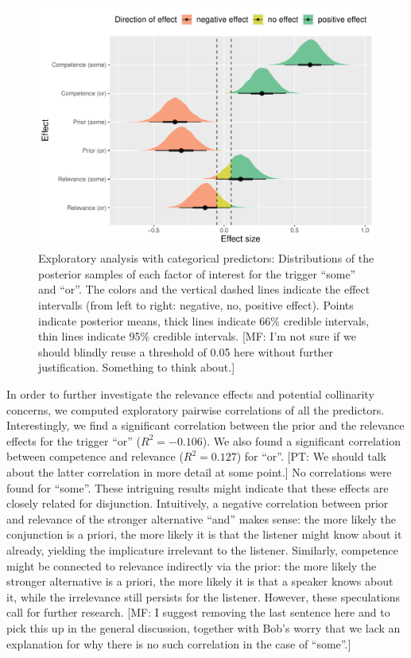 \documentclass{sp}
\newcommand{\mf}[1]{\textcolor{BurntOrange}{[MF: #1]}}
\newcommand{\pt}[1]{\textcolor{Cerulean}{[PT: #1]}}
\begin{document}
\begin{figure}[h]
	\begin{center}
		\includegraphics[width=1\linewidth]{images/posterior-effects-categorical.pdf}
	\end{center}
	\vspace{-0.3cm}
	\caption{Exploratory analysis with categorical predictors: Distributions of the posterior samples of each factor of interest for the trigger ``some'' and ``or''. The colors and the vertical dashed lines indicate the effect intervalls (from left to right: negative, no, positive effect). Points indicate posterior means, thick lines indicate 66\% credible intervals, thin lines indicate 95\% credible intervals. \mf{I'm not sure if we should blindly reuse a threshold of 0.05 here without further justification. Something to think about.}}
	\label{posteriors-cat}
\end{figure}

In order to further investigate the relevance effects and potential collinarity concerns, we computed exploratory pairwise correlations of all the predictors. Interestingly, we find a significant correlation between the prior and the relevance effects for the trigger ``or'' ($R^2 = -0.106$). We also found a significant correlation between competence and relevance ($R^2 = 0.127$) for ``or''. \pt{We should talk about the latter correlation in more detail at some point.} No correlations were found for ``some''. These intriguing results might indicate that these effects are closely related for disjunction. Intuitively, a negative correlation between prior and relevance of the stronger alternative ``and'' makes sense: the more likely the conjunction is a priori, the more likely it is that the listener might know about it already, yielding the implicature irrelevant to the listener. Similarly, competence might be connected to relevance indirectly via the prior: the more likely the stronger alternative is a priori, the more likely it is that a speaker knows about it, while the irrelevance still persists for the listener. However, these speculations call for further research. \mf{I suggest removing the last sentence here and to pick this up in the general discussion, together with Bob's worry that we lack an explanation for why there is no such correlation in the case of ``some''.}
\end{document}

